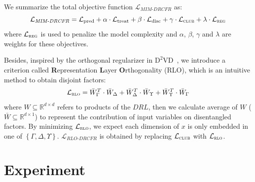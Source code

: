 \documentclass[sigconf]{acmart}
\begin{document}
We summarize the total objective function $\mathcal{L_{\textit{MIM-DRCFR}}}$ as:
\begin{equation}
\label{E1}
    \mathcal{L_{\textit{MIM-DRCFR}}} = \mathcal{L}_{\text{pred}} + \alpha \cdot \mathcal{L}_{\text{treat}} +\beta \cdot \mathcal{L}_{\text{disc}} + \gamma \cdot \mathcal{L}_{\textsc{club}} +\lambda \cdot \mathcal{L}_{\textsc{reg}}
\end{equation}
where $\mathcal{L}_{\textsc{reg}}$ is used to penalize the model complexity and $\alpha$, $\beta$, $\gamma$ and $\lambda$ are weights for these objectives.\par
Besides, inspired by the orthogonal regularizer in $\mathrm{D}^{2}$VD~\citep{Kuang2017TreatmentEE}, we introduce a criterion called \textbf{R}epresentation \textbf{L}ayer \textbf{O}rthogonality (\textsc{RLO}), which is an intuitive method to obtain disjoint factors:
\begin{equation}
\label{E1}
    \mathcal{L}_{\textsc{rlo}} = \bar{W}_{\Gamma}^{T} \cdot \bar{W}_{\Delta} + \bar{W}_{\Delta}^{T} \cdot \bar{W}_{\Upsilon} + \bar{W}_{\Upsilon}^{T} \cdot \bar{W}_{\Gamma}
\end{equation}
where $W \subseteq \mathbb{R}^{d \times d}$ refers to products of the $DRL$, then we calculate average of $W$ ($\bar{W} \subseteq \mathbb{R}^{d \times 1}$) to represent the contribution of input variables on disentangled factors. By minimizing  $\mathcal{L}_{\textsc{rlo}}$, we expect each dimension of $x$ is only embedded in one of $\left \{ \Gamma,\Delta,\Upsilon \right \}$. $\mathcal{L_{\textit{RLO-DRCFR}}}$ is obtained by replacing $\mathcal{L}_{\textsc{club}}$ with $\mathcal{L}_{\textsc{rlo}}$. 

\section{Experiment}
\end{document}
